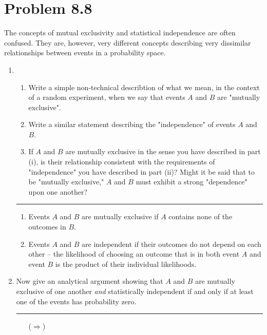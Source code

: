 \documentclass{article}
\newcommand{\horline}
           {\begin{center}
              \noindent\rule{8cm}{0.4pt}
            \end{center}}
\begin{document}
\section*{Problem 8.8}
The concepts of mutual exclusivity and statistical independence are often
confused. They are, however, very different concepts describing very
dissimilar relationships between events in a probability space.
\begin{enumerate}[label=(\alph*)]
  \item{\begin{enumerate}[label=(\roman*)]
          \item{Write a simple non-technical describtion of what we mean, in
                the context of a random experiment, when we say that events
                $A$ and $B$ are "mutually exclusive".
               }
          \item{Write a similar statement describing the "independence" of
                events $A$ and $B$.
               }
          \item{If $A$ and $B$ are mutually exclusive in the sense you have
                described in part (i), is their relationship consistent
                with the requirements of "independence" you have
                described in part (ii)? Might it be said that to be
                "mutually exclusive," $A$ and $B$ must exhibit a strong
                "dependence" upon one another?
               }
        \end{enumerate}
        \horline
        \begin{enumerate}[label=(\roman*)]
          \item{Events $A$ and $B$ are mutually exclusive if $A$ contains
                none of the outcomes in $B$. 
               }
          \item{Events $A$ and $B$ are independent if their outcomes do not
                depend on each other -- the likelihood of choosing an 
                outcome that is in both event $A$ and event $B$ is the 
                product of their individual likelihoods.
               }
        \end{enumerate}
       }
  \item{Now give an analytical argument showing that $A$ and $B$ are 
        mutually exclusive of one another \textit{and} statistically
        independent if and only if at least one of the events has
        probability zero.
        \horline
        \begin{itemize}
          \item[($\Rightarrow$)]

\end{itemize}}
\end{enumerate}
\end{document}
